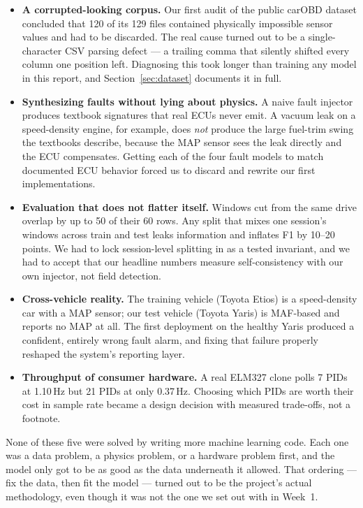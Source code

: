\begin{itemize}
  \item \textbf{A corrupted-looking corpus.} Our first audit of the public
    carOBD dataset concluded that 120 of its 129 files contained physically
    impossible sensor values and had to be discarded. The real cause turned
    out to be a single-character CSV parsing defect --- a trailing comma
    that silently shifted every column one position left. Diagnosing this
    took longer than training any model in this report, and
    Section~\ref{sec:dataset} documents it in full.
  \item \textbf{Synthesizing faults without lying about physics.} A naive
    fault injector produces textbook signatures that real ECUs never emit.
    A vacuum leak on a speed-density engine, for example, does \emph{not}
    produce the large fuel-trim swing the textbooks describe, because the
    MAP sensor sees the leak directly and the ECU compensates. Getting each
    of the four fault models to match documented ECU behavior forced us to
    discard and rewrite our first implementations.
  \item \textbf{Evaluation that does not flatter itself.} Windows cut from
    the same drive overlap by up to 50 of their 60 rows. Any split that
    mixes one session's windows across train and test leaks information and
    inflates F1 by 10--20 points. We had to lock session-level splitting in
    as a tested invariant, and we had to accept that our headline numbers
    measure self-consistency with our own injector, not field detection.
  \item \textbf{Cross-vehicle reality.} The training vehicle (Toyota Etios)
    is a speed-density car with a MAP sensor; our test vehicle (Toyota
    Yaris) is MAF-based and reports no MAP at all. The first deployment on
    the healthy Yaris produced a confident, entirely wrong fault alarm, and
    fixing that failure properly reshaped the system's reporting layer.
  \item \textbf{Throughput of consumer hardware.} A real ELM327 clone polls
    7 PIDs at 1.10\,Hz but 21 PIDs at only 0.37\,Hz. Choosing which PIDs
    are worth their cost in sample rate became a design decision with
    measured trade-offs, not a footnote.
\end{itemize}

None of these five were solved by writing more machine learning code. Each
one was a data problem, a physics problem, or a hardware problem first, and
the model only got to be as good as the data underneath it allowed. That
ordering --- fix the data, then fit the model --- turned out to be the
project's actual methodology, even though it was not the one we set out
with in Week~1.

